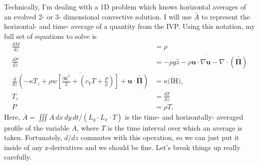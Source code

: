 \documentclass[aps, pre, onecolumn, nofootinbib, notitlepage, groupedaddress, amsfonts, amssymb, amsmath, longbibliography]{revtex4-1}
\newcommand{\Div}[1]{\ensuremath{\nabla\cdot\left( #1\right)}}
\newcommand{\grad}{\ensuremath{\nabla}}
\newcommand{\stressT}{\ensuremath{\bm{\bar{\bar{\Pi}}}}}
\begin{document}
Technically, I'm dealing with a 1D problem which knows horizontal averages of an evolved 2- or 3- dimensional
convective solution.  I will use $\overline{A}$ to represent the horizontal- and time- average of a quantity
from the IVP.  Using this notation, my full set of equations to solve is
\begin{equation}
\begin{split}
\frac{d M}{dz} &= \rho \\
\overline{\frac{d P}{dz}} &= \overline{-\rho g \hat{z} - \rho \bm{u}\cdot\grad\bm{u} - \Div{\stressT}} \\
\overline{\frac{d}{dz}\left(-\kappa T_z + \rho w\left[\frac{|\bm{u}|^2}{2} + 
\left(c_V T + \frac{P}{\rho}\right)\right] + \bm{u}\cdot\stressT  \right)} &= \overline{\kappa \text{(IH)}}, \\
T_z &= \frac{dT}{dz} \\
P &= \rho T,
\end{split}
\end{equation}
Here, $\overline{A} = \iiint A \,dx \,dy \,dt / (L_y\cdot L_x\cdot T)$ is the time- and horizontally-
averaged profile of the variable $A$, where $T$ is the time interval over which an average is taken.
Fortunately, $d/dz$ commutes with this operation, so we can just put it inside of any z-derivatives
and we should be fine.  Let's break things up really carefully.
\end{document}
